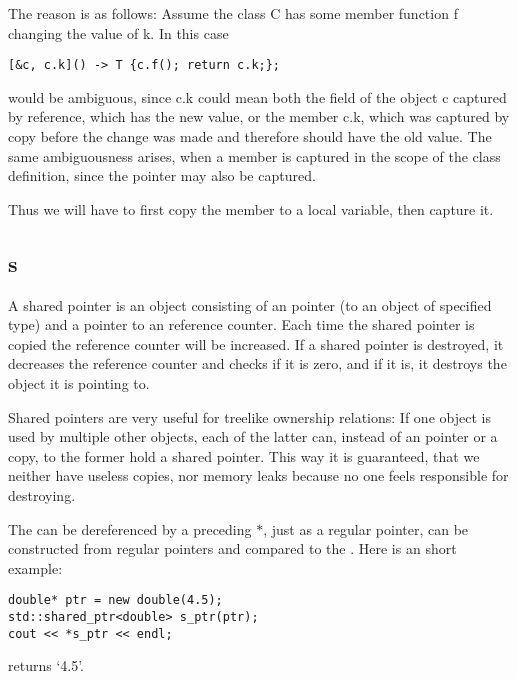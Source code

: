 The reason is as follows: Assume the class C has some member function f changing the value of k. In this case
\begin{lstlisting}
[&c, c.k]() -> T {c.f(); return c.k;};
\end{lstlisting}
would be ambiguous, since c.k could mean both the field of the object c captured by reference, which has the new value, or the member c.k, which was captured by copy before the change was made and therefore should have the old value. The same ambiguousness arises, when a member is captured in the scope of the class definition, since the  pointer may also be captured.

Thus we will have to first copy the member to a local variable, then capture it.

\subsection{s}

A shared pointer is an object consisting of an pointer (to an object of specified type) and a pointer to an reference counter. Each time the shared pointer is copied the reference counter will be increased. If a shared pointer is destroyed, it decreases the reference counter and checks if it is zero, and if it is, it destroys the object it is pointing to.

Shared pointers are very useful for treelike ownership relations: If one object is used by multiple other objects, each of the latter can, instead of an pointer or a copy, to the former hold a shared pointer. This way it is guaranteed, that we neither have useless copies, nor memory leaks because no one feels responsible for destroying.

The  can be dereferenced by a preceding $*$, just as a regular pointer, can be constructed from regular pointers and compared to the \NULL. Here is an short example:

\begin{lstlisting}
double* ptr = new double(4.5);
std::shared_ptr<double> s_ptr(ptr);
cout << *s_ptr << endl;
\end{lstlisting}
returns \lq 4.5\rq.

